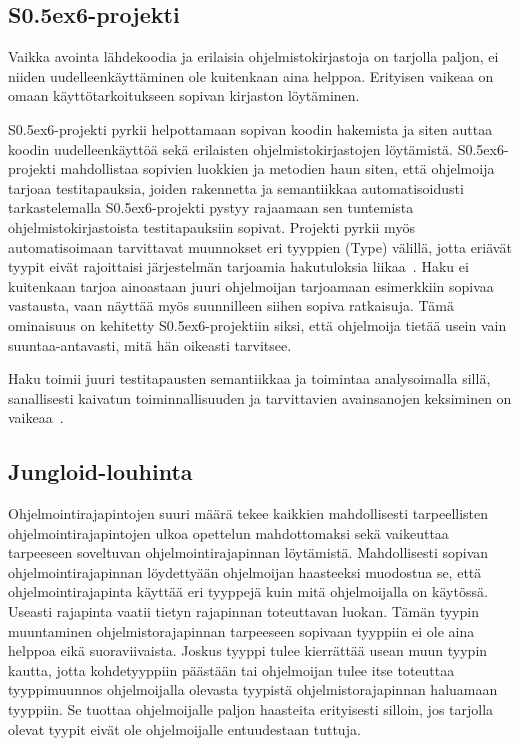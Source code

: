 \documentclass[finnish]{tktltiki2}
\theoremstyle{definition}
\theoremstyle{remark}
\begin{document}
\subsection{S\raise0.5ex\hbox{6}-projekti}
Vaikka avointa lähdekoodia ja erilaisia ohjelmistokirjastoja on tarjolla paljon, ei niiden uudelleenkäyttäminen ole kuitenkaan aina helppoa. Erityisen vaikeaa on omaan käyttötarkoitukseen sopivan kirjaston löytäminen.

S\raise0.5ex\hbox{6}-projekti pyrkii helpottamaan sopivan koodin hakemista ja siten auttaa koodin uudelleenkäyttöä sekä erilaisten ohjelmistokirjastojen löytämistä. S\raise0.5ex\hbox{6}-projekti mahdollistaa sopivien luokkien ja metodien haun siten, että ohjelmoija tarjoaa testitapauksia, joiden rakennetta ja semantiikkaa automatisoidusti tarkastelemalla S\raise0.5ex\hbox{6}-projekti pystyy rajaamaan sen tuntemista ohjelmistokirjastoista testitapauksiin sopivat. Projekti pyrkii myös automatisoimaan tarvittavat muunnokset eri tyyppien (Type) välillä, jotta eriävät tyypit eivät rajoittaisi järjestelmän tarjoamia hakutuloksia liikaa~\cite{what-to-search-for}. Haku ei kuitenkaan tarjoa ainoastaan juuri ohjelmoijan tarjoamaan esimerkkiin sopivaa vastausta, vaan näyttää myös suunnilleen siihen sopiva ratkaisuja. Tämä ominaisuus on kehitetty S\raise0.5ex\hbox{6}-projektiin siksi, että ohjelmoija tietää usein vain suuntaa-antavasti, mitä hän oikeasti tarvitsee.

Haku toimii juuri testitapausten semantiikkaa ja toimintaa analysoimalla sillä, sanallisesti kaivatun toiminnallisuuden ja tarvittavien avainsanojen keksiminen on vaikeaa~\cite{what-to-search-for}.

\subsection{Jungloid-louhinta}
Ohjelmointirajapintojen suuri määrä tekee kaikkien mahdollisesti tarpeellisten ohjelmointirajapintojen ulkoa opettelun mahdottomaksi sekä vaikeuttaa tarpeeseen soveltuvan ohjelmointirajapinnan löytämistä. Mahdollisesti sopivan ohjelmointirajapinnan löydettyään ohjelmoijan haasteeksi muodostua se, että ohjelmointirajapinta käyttää eri tyyppejä kuin mitä ohjelmoijalla on käytössä. Useasti rajapinta vaatii tietyn rajapinnan toteuttavan luokan. Tämän tyypin muuntaminen ohjelmistorajapinnan tarpeeseen sopivaan tyyppiin ei ole aina helppoa eikä suoraviivaista. Joskus tyyppi tulee kierrättää usean muun tyypin kautta, jotta kohdetyyppiin päästään tai ohjelmoijan tulee itse toteuttaa tyyppimuunnos ohjelmoijalla olevasta tyypistä ohjelmistorajapinnan haluamaan tyyppiin. Se tuottaa ohjelmoijalle paljon haasteita erityisesti silloin, jos tarjolla olevat tyypit eivät ole ohjelmoijalle entuudestaan tuttuja.
\end{document}
